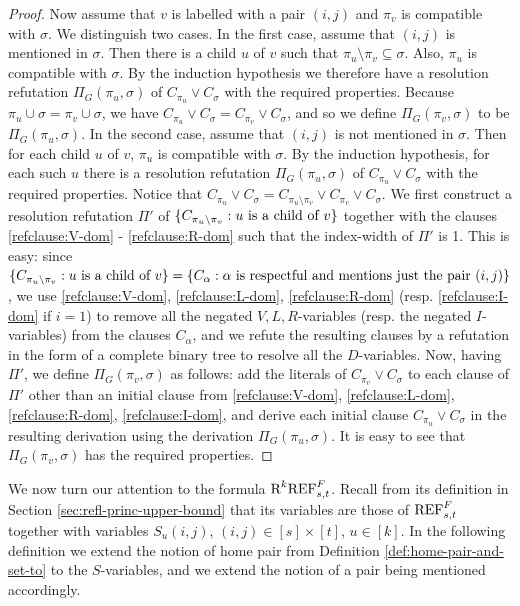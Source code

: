 \begin{proof}
Now assume that $v$ is labelled with a pair $(i,j)$ and $\pi_v$ is compatible with $\sigma$. We distinguish two cases. In the first case, assume that $(i,j)$ is mentioned in $\sigma$. Then there is a child $u$ of $v$ such that $\pi_u \setminus \pi_v \subseteq \sigma$. Also, $\pi_u$ is compatible with $\sigma$. By the induction hypothesis we therefore have a resolution refutation $\Pi_G(\pi_u,\sigma)$ of $C_{\pi_u} \lor C_{\sigma}$ with the required properties. Because $\pi_u \cup \sigma = \pi_v \cup \sigma$, we have $C_{\pi_u} \lor C_{\sigma} = C_{\pi_v} \lor C_{\sigma}$, and so we define $\Pi_G(\pi_v,\sigma)$ to be $\Pi_G(\pi_u,\sigma)$. In the second case, assume that $(i,j)$ is not mentioned in $\sigma$. Then for each child $u$ of $v$, $\pi_u$ is compatible with $\sigma$. By the induction hypothesis, for each such $u$ there is a resolution refutation $\Pi_G(\pi_u,\sigma)$ of $C_{\pi_u} \lor C_{\sigma}$ with the required properties. Notice that $C_{\pi_u} \lor C_{\sigma} = C_{\pi_u \setminus \pi_v} \lor C_{\pi_v} \lor C_{\sigma}$. We first construct a resolution refutation $\Pi'$ of $\{ C_{\pi_u \setminus \pi_v} : u \textnormal{ is a child of } v \}$ together with the clauses \eqref{refclause:V-dom} - \eqref{refclause:R-dom} such that the index-width of $\Pi'$ is 1. 
This is easy: since $\{ C_{\pi_u \setminus \pi_v} : u \textnormal{ is a child of } v \} = \{C_{\alpha} : \alpha \textnormal{ is respectful and mentions just the pair } (i,j) \}$, we use \eqref{refclause:V-dom}, \eqref{refclause:L-dom}, \eqref{refclause:R-dom} (resp. \eqref{refclause:I-dom} if $i=1$) to remove all the negated $V,L,R$-variables (resp. the negated $I$-variables) from the clauses $C_{\alpha}$, and we refute the resulting clauses by a refutation in the form of a complete binary tree to resolve all the $D$-variables.
Now, having $\Pi'$, we define $\Pi_G(\pi_v, \sigma)$ as follows: add the literals of $C_{\pi_v} \lor C_{\sigma}$ to each clause of $\Pi'$ other than an initial clause from \eqref{refclause:V-dom}, \eqref{refclause:L-dom}, \eqref{refclause:R-dom}, \eqref{refclause:I-dom}, and derive each initial clause $C_{\pi_u} \lor C_{\sigma}$ in the resulting derivation using the derivation $\Pi_G(\pi_u,\sigma)$. It is easy to see that $\Pi_G(\pi_v, \sigma)$ has the required properties. 
\end{proof}

We now turn our attention to the formula $\textnormal{R}^k\textnormal{REF}^{F}_{s,t}$. Recall from its definition in Section \ref{sec:refl-princ-upper-bound} that its variables are those of  $\textnormal{REF}^{F}_{s,t}$ together with variables $S_u(i,j)$, $(i,j) \in [s] \times [t]$, $u \in [k]$.
In the following definition we extend the notion of home pair from Definition \ref{def:home-pair-and-set-to} to the $S$-variables, and we extend the notion of a pair being mentioned accordingly.

